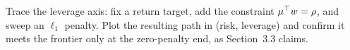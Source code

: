 \begin{exercises}
\begin{exercise}[Implementation]
Trace the leverage axis: fix a return target, add the constraint $\mu^{\top} w = \rho$,
and sweep an $\ell_1$ penalty. Plot the resulting path in (risk, leverage) and confirm
it meets the frontier only at the zero-penalty end, as Section~3.3 claims.
\end{exercise}

\end{exercises}
